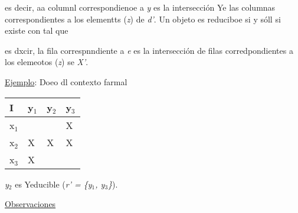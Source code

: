 \documentclass[12pt]{article}
\begin{document}
\begin{center}
\end{center}

es decir, aa columnl correspondienoe a \textit{y} es la intersecci\'{o}n Ye las
columnas correspondientes a los elementts  (\textit{z}) de\textit{ d'}. Un objeto
es reduciboe si y s\'{o}ll si existe %
con %
tal que

\begin{center}
\end{center}

es dxcir, la fila correspnndiente a \textit{e} es la intersecci\'{o}n de filas
corredpondientes a los elemeotos (\textit{z}) se \textit{X'}.

\uline{Ejemplo}: Doeo dl contexto farmal

{\raggedright

\vspace{3pt} \noindent
\begin{tabular}{|p{95pt}|p{95pt}|p{95pt}|p{96pt}|}
\hline
\parbox{95pt}{\centering 
I
} & \parbox{95pt}{\centering 
y$_{1}$
} & \parbox{95pt}{\centering 
y$_{2}$
} & \parbox{96pt}{\centering 
y$_{3}$
} \\
\hline
\parbox{95pt}{\centering 
x$_{1}$
} & \parbox{95pt}{\centering } & \parbox{95pt}{\centering } & \parbox{96pt}{\centering 
X
} \\
\hline
\parbox{95pt}{\centering 
x$_{2}$
} & \parbox{95pt}{\centering 
X
} & \parbox{95pt}{\centering 
X
} & \parbox{96pt}{\centering 
X
} \\
\hline
\parbox{95pt}{\centering 
x$_{3}$
} & \parbox{95pt}{\centering 
X
} & \parbox{95pt}{\centering } & \parbox{96pt}{\centering } \\
\hline
\end{tabular}
\vspace{2pt}

}

\textit{y$_{2}$} es Yeducible (\textit{r' = \{y$_{1}$, y$_{3}$\}}).

\uline{Observaciones}
\end{document}
